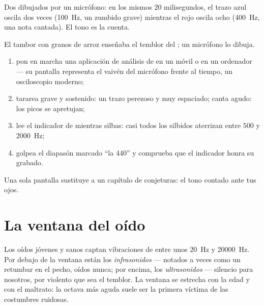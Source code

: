 \begin{omfigure}

{\small Dos  dibujados por un micrófono: en los mismos $20$
milisegundos, el trazo azul oscila dos veces (\qty{100}{Hz}, un
zumbido grave) mientras el rojo oscila ocho (\qty{400}{Hz}, una nota
cantada). El tono es la cuenta.}
\end{omfigure}

\begin{method}\label{met:g8:sound-pitch-loudness:seeing}
El tambor con granos de arroz enseñaba el temblor del ; un
micrófono lo dibuja.
\begin{enumerate}
  \item pon en marcha una aplicación de análisis de  en un
        móvil o en un ordenador --- su pantalla representa el vaivén
        del micrófono frente al tiempo, un osciloscopio moderno;
  \item tararea grave y sostenido: un trazo perezoso y muy espaciado;
        canta agudo: los picos se apretujan;
  \item lee el indicador de  mientras silbas: casi
        todos los silbidos aterrizan entre $500$ y \qty{2000}{Hz};
  \item golpea el diapasón marcado ``la 440'' y comprueba que el
        indicador honra su grabado.
\end{enumerate}
Una sola pantalla sustituye a un capítulo de conjeturas: el tono
contado ante tus ojos.
\end{method}

\section{La ventana del oído}

\begin{proposition}\label{prop:g8:sound-pitch-loudness:range}
Los oídos jóvenes y sanos captan vibraciones de entre unos
\qty{20}{Hz} y \qty{20000}{Hz}. Por debajo de la ventana están los
\emph{infrasonidos} --- notados a veces como un
retumbar en el pecho, oídos nunca; por encima, los
\emph{ultrasonidos} --- silencio para nosotros, por
violento que sea el temblor. La ventana se estrecha con la edad y con
el maltrato: la octava más aguda suele ser la primera víctima de las
costumbres ruidosas.
\end{proposition}

